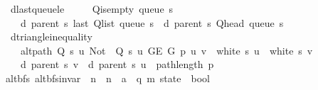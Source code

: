 \begin{isabellebody}
\ \ \ d{\isacharunderscore}{\kern0pt}last{\isacharunderscore}{\kern0pt}queue{\isacharunderscore}{\kern0pt}le{\isacharcolon}{\kern0pt}\isanewline
\ \ \ \ {\isachardoublequoteopen}{\isasymnot}\ Q{\isacharunderscore}{\kern0pt}is{\isacharunderscore}{\kern0pt}empty\ {\isacharparenleft}{\kern0pt}queue\ s{\isacharparenright}{\kern0pt}\ {\isasymLongrightarrow}\isanewline
\ \ \ \ \ d\ {\isacharparenleft}{\kern0pt}parent\ s{\isacharparenright}{\kern0pt}\ {\isacharparenleft}{\kern0pt}last\ {\isacharparenleft}{\kern0pt}Q{\isacharunderscore}{\kern0pt}list\ {\isacharparenleft}{\kern0pt}queue\ s{\isacharparenright}{\kern0pt}{\isacharparenright}{\kern0pt}{\isacharparenright}{\kern0pt}\ {\isasymle}\ d\ {\isacharparenleft}{\kern0pt}parent\ s{\isacharparenright}{\kern0pt}\ {\isacharparenleft}{\kern0pt}Q{\isacharunderscore}{\kern0pt}head\ {\isacharparenleft}{\kern0pt}queue\ s{\isacharparenright}{\kern0pt}{\isacharparenright}{\kern0pt}\ {\isacharplus}{\kern0pt}\ {}{\isachardoublequoteclose}\isanewline
\ \ \ d{\isacharunderscore}{\kern0pt}triangle{\isacharunderscore}{\kern0pt}inequality{\isacharcolon}{\kern0pt}\isanewline
\ \ \ \ {\isachardoublequoteopen}{\isasymlbrakk}\ alt{\isacharunderscore}{\kern0pt}path\ {\isacharparenleft}{\kern0pt}Q\ s\ u{\isacharparenright}{\kern0pt}\ {\isacharparenleft}{\kern0pt}Not\ {\isasymcirc}\ Q\ s\ u{\isacharparenright}{\kern0pt}\ {\isacharparenleft}{\kern0pt}G{\isachardot}{\kern0pt}E\ G{\isacharparenright}{\kern0pt}\ p\ u\ v{\isacharsemicolon}{\kern0pt}\ {\isasymnot}\ white\ s\ u{\isacharsemicolon}{\kern0pt}\ {\isasymnot}\ white\ s\ v\ {\isasymrbrakk}\ {\isasymLongrightarrow}\isanewline
\ \ \ \ \ d\ {\isacharparenleft}{\kern0pt}parent\ s{\isacharparenright}{\kern0pt}\ v\ {\isasymle}\ d\ {\isacharparenleft}{\kern0pt}parent\ s{\isacharparenright}{\kern0pt}\ u\ {\isacharplus}{\kern0pt}\ path{\isacharunderscore}{\kern0pt}length\ p{\isachardoublequoteclose}\isanewline
%
\isadeliminvisible
\isanewline
%
\endisadeliminvisible
%
\isataginvisible
{}\isamarkupfalse%
\ {\isacharparenleft}{\kern0pt}\ alt{\isacharunderscore}{\kern0pt}bfs{\isacharparenright}{\kern0pt}\ alt{\isacharunderscore}{\kern0pt}bfs{\isacharunderscore}{\kern0pt}invar{\isacharprime}{\kern0pt}\ {\isacharcolon}{\kern0pt}{\isacharcolon}{\kern0pt}\ {\isachardoublequoteopen}{\isacharprime}{\kern0pt}n\ {\isasymRightarrow}\ {\isacharprime}{\kern0pt}n\ {\isasymRightarrow}\ {\isacharprime}{\kern0pt}a\ {\isasymRightarrow}\ {\isacharparenleft}{\kern0pt}{\isacharprime}{\kern0pt}q{\isacharcomma}{\kern0pt}\ {\isacharprime}{\kern0pt}m{\isacharparenright}{\kern0pt}\ state\ {\isasymRightarrow}\ bool{\isachardoublequoteclose}\ \isanewline

\end{isabellebody}
